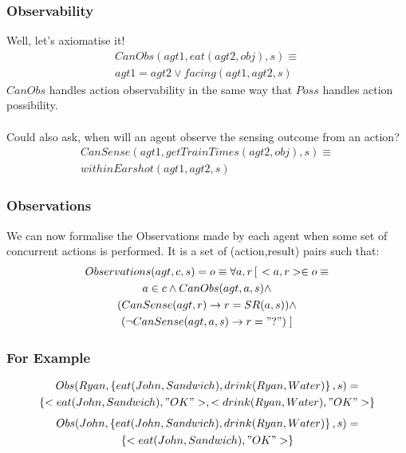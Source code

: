 \documentclass{beamer}
\begin{document}
\begin{frame}
\frametitle{Observability}
Well, let's axiomatise it!
\begin{multline*}
  CanObs(agt1,eat(agt2,obj),s) \equiv \\
     agt1=agt2 \vee facing(agt1,agt2,s)
\end{multline*}
$CanObs$ handles action observability in the same way that $Poss$ handles
action possibility.
\ \\
\ \\
\pause
Could also ask, when will an agent observe the sensing outcome from an
action?
\begin{multline*}
  CanSense(agt1,getTrainTimes(agt2,obj),s) \equiv \\ withinEarshot(agt1,agt2,s)
\end{multline*}
\end{frame}

\begin{frame}
\frametitle{Observations}
We can now formalise the Observations made by each agent when some set of
concurrent actions is performed.  It is a set of (action,result) pairs such
that:
\begin{multline*}
Observations(agt,c,s) = o \equiv \forall a,r \left[\right. <a,r> \in o \equiv \\
  a \in c \wedge CanObs(agt,a,s) \wedge \\
  (CanSense(agt,r) \rightarrow r = SR(a,s)) \wedge \\
  (\neg CanSense(agt,a,s) \rightarrow r = "?") \left.\right]\\
\end{multline*}

\end{frame}

\begin{frame}
\frametitle{For Example}
\begin{multline*}
  Obs(Ryan,\left\{eat(John,Sandwich),drink(Ryan,Water)\right\},s) = \\
     \left\{<eat(John,Sandwich),"OK">,<drink(Ryan,Water),"OK">\right\}
\end{multline*}
\pause
\begin{multline*}
  Obs(John,\left\{eat(John,Sandwich),drink(Ryan,Water)\right\},s) = \\
     \left\{<eat(John,Sandwich),"OK">\right\}
\end{multline*}
\end{frame}
\end{document}
